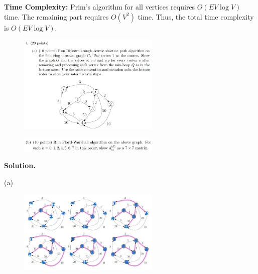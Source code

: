 \documentclass[10pt]{article}
\begin{document}
\textbf{Time Complexity:} Prim's algorithm for all vertices requires $O(EV\log V)$ time. The remaining part requires $O(V^2)$ time. Thus, the total time complexity is $O(EV\log V)$.

\newpage

\begin{figure}[h]
	\centering
	\includegraphics[width=0.6\textwidth]{hw4-4(1)}
\end{figure}
\begin{figure}[h]
	\centering
	\includegraphics[width=0.6\textwidth]{hw4-4(2)}
\end{figure}

\textbf{Solution.}

(a)
\begin{figure}[H]
	\centering
	\includegraphics[width=0.6\textwidth]{hw4-4-ans(1)}
\end{figure}
\end{document}
